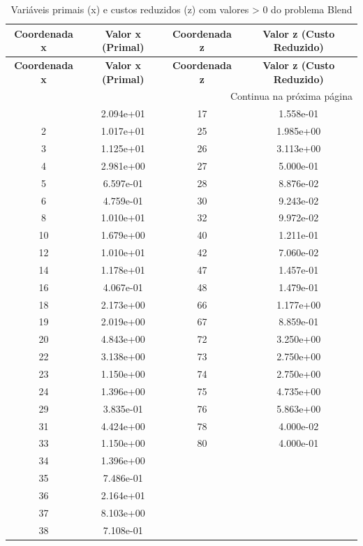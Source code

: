 \documentclass[12pt]{article}
\begin{document}
\begin{longtable}{@{}cccc@{}}
\caption{Variáveis primais (x) e custos reduzidos (z) com valores > 0 do problema Blend} \\
\toprule
\textbf{Coordenada x} & \textbf{Valor x (Primal)} & \textbf{Coordenada z} & \textbf{Valor z (Custo Reduzido)} \\
\midrule
\endfirsthead

\toprule
\textbf{Coordenada x} & \textbf{Valor x (Primal)} & \textbf{Coordenada z} & \textbf{Valor z (Custo Reduzido)} \\
\midrule
\endhead

\midrule \multicolumn{4}{r}{{Continua na próxima página}} \\ \midrule
\endfoot

\bottomrule
\endlastfoot
1 & 2.094e+01 & 17 & 1.558e-01 \\
2 & 1.017e+01 & 25 & 1.985e+00 \\
3 & 1.125e+01 & 26 & 3.113e+00 \\
4 & 2.981e+00 & 27 & 5.000e-01 \\
5 & 6.597e-01 & 28 & 8.876e-02 \\
6 & 4.759e-01 & 30 & 9.243e-02 \\
8 & 1.010e+01 & 32 & 9.972e-02 \\
10 & 1.679e+00 & 40 & 1.211e-01 \\
12 & 1.010e+01 & 42 & 7.060e-02 \\
14 & 1.178e+01 & 47 & 1.457e-01 \\
16 & 4.067e-01 & 48 & 1.479e-01 \\
18 & 2.173e+00 & 66 & 1.177e+00 \\
19 & 2.019e+00 & 67 & 8.859e-01 \\
20 & 4.843e+00 & 72 & 3.250e+00 \\
22 & 3.138e+00 & 73 & 2.750e+00 \\
23 & 1.150e+00 & 74 & 2.750e+00 \\
24 & 1.396e+00 & 75 & 4.735e+00 \\
29 & 3.835e-01 & 76 & 5.863e+00 \\
31 & 4.424e+00 & 78 & 4.000e-02 \\
33 & 1.150e+00 & 80 & 4.000e-01 \\
34 & 1.396e+00 &  &  \\
35 & 7.486e-01 &  &  \\
36 & 2.164e+01 &  &  \\
37 & 8.103e+00 &  &  \\
38 & 7.108e-01 &  &  \\

\end{longtable}
\end{document}

